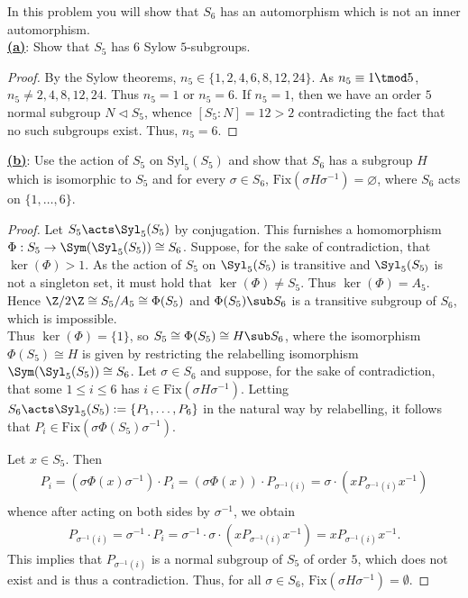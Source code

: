 \documentclass[12pt]{article}
\begin{document}
\begin{homeworkProblem}
  In this problem you will show that $S_6$ has an automorphism which is not an inner automorphism.\\

  \underline{\textbf{(a)}}: Show that $S_5$ has $6$ Sylow $5$-subgroups.

  \begin{proof}
    By the Sylow theorems, $ n_{5}\in \{1, 2, 4, 6, 8 ,12, 24\} $. As $ n_{5 }\equiv 1 \tmod 5 $, $ n_{5}\neq 2,4,8,12,24 $. Thus $ n_{5} =1 $ or $ n_{5}= 6 $. If $ n_{5}=1 $, then we have an order $ 5 $ normal subgroup $ N\triangleleft S_{5} $, whence $ [S_{5}: N] = 12>2 $ contradicting the fact that no such subgroups exist. Thus, $ n_{5}=6 $.
  \end{proof}

  \underline{\textbf{(b)}}: Use the action of $S_5$ on $\mathrm{Syl}_5(S_5)$ and show that $S_6$ has a subgroup $H$ which is isomorphic to $S_5$ and for every $\sigma \in S_6$, $\mathrm{Fix}(\sigma H \sigma^{-1}) = \varnothing$, where $S_6$ acts on $\{1, \dots, 6\}$.
\begin{proof}
  Let $ S_{5}\acts \Syl_{5}(S_{5}) $ by conjugation. This furnishes a homomorphism $ \Phi:S_{5}\to \Sym(\Syl_{5}(S_{5}))\cong S_{6} $. Suppose, for the sake of contradiction, that $ \ker(\Phi) > 1 $. As the action of $ S_{5} $ on $ \Syl_{5}(S_{5}) $ is transitive and $ \Syl_{5}(S_{5)} $ is not a singleton set, it must hold that $ \ker(\Phi) \neq S_{5} $. Thus $ \ker(\Phi) = A_{5} $. Hence $ \Z/2\Z\cong S_{5}/A_{5} \cong \Phi(S_{5}) $ and $ \Phi(S_{5})\sub S_{6} $ is a transitive subgroup of $ S_{6} $, which is impossible.\\

  Thus $ \ker (\Phi) = \{1\} $, so $ S_{5}\cong \Phi(S_{5}) \cong H \sub S_{6} $, where the isomorphism $ \Phi(S_{5}) \cong H $ is given by restricting the relabelling isomorphism $ \Sym(\Syl_{5}(S_{5})) \cong S_{6} $. Let $ \sigma\in S_{6} $ and suppose, for the sake of contradiction, that some $1\leq i \leq 6 $ has $ i\in \mathrm{Fix}(\sigma H \sigma^{-1})$. Letting $ S_{6}\acts \Syl_{5}(S_{5}) := \{P_{1},\ldots, P_{6}\} $ in the natural way by relabelling, it follows that $ P_{i}\in \mathrm{Fix}(\sigma \Phi(S_{5}) \sigma^{-1}) $.

  Let $ x\in S_{5} $. Then 
  \begin{align*}
    P_{i} = (\sigma\Phi(x) \sigma^{-1}) \cdot P_{i} = (\sigma\Phi(x))\cdot P_{\sigma^{-1}(i)} = \sigma\cdot (xP_{\sigma^{-1}(i)}x^{-1})\\
  \end{align*}
  whence after acting on both sides by $ \sigma^{-1} $, we obtain
  \begin{align*}
    P_{\sigma^{-1}(i)} = \sigma^{-1}\cdot P_{i}=\sigma^{-1}\cdot\sigma\cdot( xP_{\sigma^{-1}(i)}x^{-1}) = xP_{\sigma^{-1}(i)}x^{-1}.
  \end{align*}
  This implies that $ P_{\sigma^{-1}(i)} $ is a normal subgroup of $ S_{5} $ of order $ 5 $, which does not exist and is thus a contradiction. Thus, for all $ \sigma\in S_{6} $, $ \mathrm{Fix}(\sigma H \sigma^{-1}) = \emptyset $.
\end{proof}


\end{homeworkProblem}
\end{document}
